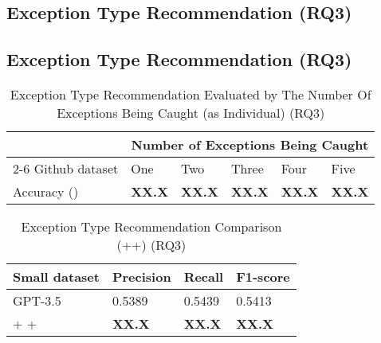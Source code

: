 \subsection{Exception Type Recommendation (RQ3)}
\label{sec:rq3}

\subsection{Exception Type Recommendation (RQ3)}
\label{sec:rq3}

\begin{table}[t]%
  \caption{Exception Type Recommendation Evaluated by The Number Of Exceptions Being Caught (\xtype as Individual) (RQ3)}
  \vspace{-12pt}
  \small
	\begin{center}
		\renewcommand{\arraystretch}{1}
		\begin{tabular}{| p{2.3cm}<{\centering} | p{0.8cm}<{\centering} | p{0.8cm}<{\centering}| p{0.8cm}<{\centering} | p{0.8cm}<{\centering} | p{0.8cm}<{\centering} |}
		  \hline
			\multirow{2}{*}{} & \multicolumn{5}{c|}{Number of Exceptions Being Caught} \\
			\cline{2-6}
			 Github dataset & One & Two & Three & Four & Five\\
			\hline
			Accuracy (\xtype) &  \textbf{XX.X} & \textbf{XX.X} & \textbf{XX.X} & \textbf{XX.X} & \textbf{XX.X}\\
			\hline
		\end{tabular}
		\label{tab:r3-xtype-1}
	\end{center}
\end{table}

\begin{table}[t]%
  \caption{Exception Type Recommendation Comparison (\xblock+\xstate+\xtype) (RQ3)}
  \vspace{-12pt}
  \small
	\begin{center}
		\renewcommand{\arraystretch}{1}
		\begin{tabular}{| p{3.10cm}<{\centering} | p{1.2cm}<{\centering} | p{1.2cm}<{\centering}| p{1.2cm}<{\centering}|}
		  \hline
			Small dataset  & Precision  & Recall & F1-score \\
			\hline
                        GPT-3.5 & 0.5389 & 0.5439 & 0.5413 \\
			\hline
			\xblock + \xstate  + \xtype  & \textbf{XX.X}  &  \textbf{XX.X} & \textbf{XX.X}\\
			\hline
		\end{tabular}
		\label{tab:xtype-2}
	\end{center}

\end{table}

